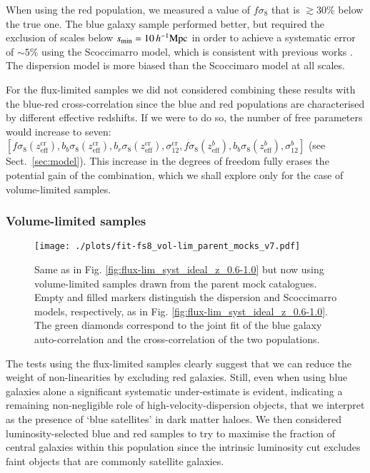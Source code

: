 \documentclass[longauth]{aa}
\def\mhmpc{\,h^{-1}{\rm Mpc}}
\begin{document}
When using the red population, we measured a value of $f\sigma_8$ that is $\gtrsim30\%$ below the true one.  The blue galaxy sample performed better, but required the exclusion of scales below $s_{\rm{min}}=10\mhmpc$ in order to achieve a systematic error of $\sim5\%$ using the Scoccimarro model, which is consistent with previous works \citep[][]{delatorre12,pezzotta16}. The dispersion model is more biased than the Scoccimaro model at all scales.

For the flux-limited samples we did not considered combining these results with the blue-red cross-correlation since the blue and red populations are characterised by different effective redshifts. If we were to do so, the number of free parameters would increase to seven: $[f\sigma_8(z^{\mathrm{cr}}_{\mathrm{eff}}),b_{b}\sigma_8(z^{\mathrm{cr}}_{\mathrm{eff}}),b_{r}\sigma_8(z^{\mathrm{cr}}_{\mathrm{eff}}),\sigma_{12}^{\mathrm{cr}},f\sigma_8(z^{b}_{\mathrm{eff}}),b_{b}\sigma_8(z^{b}_{\mathrm{eff}}),\sigma_{12}^{b}]$  (see Sect.~\ref{sec:model}). This increase in the degrees of freedom fully erases the potential gain of the combination, which we shall explore only for the case of volume-limited samples.


\subsubsection{Volume-limited samples}\label{sec:fit_vol_ideal}
	\begin{figure}
    \centering
		\texttt{[image: ./plots/fit-fs8\_vol-lim\_parent\_mocks\_v7.pdf]}
		\caption{Same as in Fig. \ref{fig:flux-lim_syst_ideal_z_0.6-1.0} but now using volume-limited samples drawn from the parent mock catalogues. Empty and filled markers distinguish the dispersion and Scoccimarro models, respectively, as in Fig. \ref{fig:flux-lim_syst_ideal_z_0.6-1.0}. The green diamonds correspond to the joint fit of the blue galaxy auto-correlation and the cross-correlation of the two populations.\label{fig:vol-lim_syst_ideal}}
	\end{figure}
The tests using the flux-limited samples clearly suggest that we can reduce the weight of non-linearities by excluding red galaxies. Still, even when using blue galaxies alone a significant systematic under-estimate is evident, indicating a remaining non-negligible role of high-velocity-dispersion objects, that we interpret as the presence of `blue satellites' in dark matter haloes.  We then considered luminosity-selected blue and red samples to try to maximise the fraction of central galaxies within this population since the intrinsic luminosity cut excludes faint objects that are commonly satellite galaxies.
\end{document}

